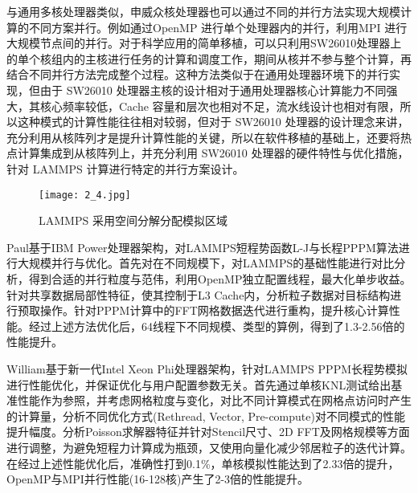 与通用多核处理器类似，申威众核处理器也可以通过不同的并行方法实现大规模计算的不同方案并行。例如通过OpenMP 进行单个处理器内的并行，利用MPI 进行大规模节点间的并行。对于科学应用的简单移植，可以只利用SW26010处理器上的单个核组内的主核进行任务的计算和调度工作，期间从核并不参与整个计算，再结合不同并行方法完成整个过程。这种方法类似于在通用处理器环境下的并行实现，但由于 SW26010 处理器主核的设计相对于通用处理器核心计算能力不同强大，其核心频率较低，Cache 容量和层次也相对不足，流水线设计也相对有限，所以这种模式的计算性能往往相对较弱，但对于 SW26010 处理器的设计理念来讲，充分利用从核阵列才是提升计算性能的关键，所以在软件移植的基础上，还要将热点计算集成到从核阵列上，并充分利用 SW26010 处理器的硬件特性与优化措施，针对 LAMMPS 计算进行特定的并行方案设计。

 \begin{figure}[h]
  \centering
  \texttt{[image: 2\_4.jpg]}
  \caption{LAMMPS 采用空间分解分配模拟区域}
 \end{figure}

Paul\cite{coffman2014lammps}基于IBM Power处理器架构，对LAMMPS短程势函数L-J与长程PPPM算法进行大规模并行与优化。首先对在不同规模下，对LAMMPS的基础性能进行对比分析，得到合适的并行粒度与范伟，利用OpenMP独立配置线程，最大化单步收益。针对共享数据局部性特征，使其控制于L3 Cache内，分析粒子数据对目标结构进行预取操作。针对PPPM计算中的FFT网格数据迭代进行重构，提升核心计算性能。经过上述方法优化后，64线程下不同规模、类型的算例，得到了1.3-2.56倍的性能提升。

William\cite{mcdoniel2017lammps}基于新一代Intel Xeon Phi处理器架构，针对LAMMPS PPPM长程势模拟进行性能优化，并保证优化与用户配置参数无关。首先通过单核KNL测试给出基准性能作为参照，并考虑网格粒度与变化，对比不同计算模式在网格点访问时产生的计算量，分析不同优化方式(Rethread, Vector, Pre-compute)对不同模式的性能提升幅度。分析Poisson求解器特征并针对Stencil尺寸、2D FFT及网格规模等方面进行调整，为避免短程力计算成为瓶颈，又使用向量化减少邻居粒子的迭代计算。在经过上述性能优化后，准确性打到0.1\%，单核模拟性能达到了2.33倍的提升，OpenMP与MPI并行性能(16-128核)产生了2-3倍的性能提升。

